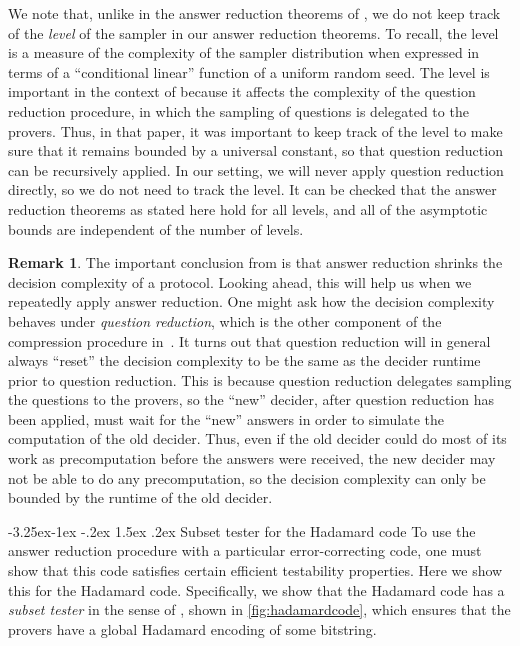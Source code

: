 \documentclass[11pt]{article}
\makeatletter
\renewcommand{\subsection}{\@startsection{subsection}{2}{\z@}%
             {-3.25ex\@plus -1ex \@minus -.2ex}%
             {1.5ex \@plus .2ex}%
             {\normalfont\large\scshape\bfseries}}
\theoremstyle{plain}
\theoremstyle{definition}
\newtheorem{remark}[theorem]{Remark}
\newcommand{\1}{\mathbb{1}} %
\makeatother
\begin{document}
We note that, unlike in the answer reduction theorems of \cite{JNVWY'20}, we do not keep track of the \emph{level} of the sampler in our answer reduction theorems. To recall, the level is a measure of the complexity of the sampler distribution when expressed in terms of a ``conditional linear'' function of a uniform random seed. The level is important in the context of \cite{JNVWY'20} because it affects the complexity of the question reduction procedure, in which the sampling of questions is delegated to the provers. Thus, in that paper, it was important to keep track of the level to make sure that it remains bounded by a universal constant, so that question reduction can be recursively applied. In our setting, we will never apply question reduction directly, so we do not need to track the level. It can be checked that the answer reduction theorems as stated here hold for all levels, and all of the asymptotic bounds are independent of the number of levels.

\begin{remark}\label{rem:qr-decision-complexity}
The important conclusion from  is that answer reduction shrinks the decision complexity of a protocol. Looking ahead, this will help us when we repeatedly apply answer reduction. One might ask how the decision complexity behaves under \emph{question reduction}, which is the other component of the compression procedure in~\cite{JNVWY'20}. It turns out that question reduction will in general always ``reset'' the decision complexity to be the same as the decider runtime prior to question reduction. This is because question reduction delegates sampling the questions to the provers, so the ``new'' decider, after question reduction has been applied, must wait for the ``new'' answers in order to simulate the computation of the old decider. Thus, even if the old decider could do most of its work as precomputation before the answers were received, the new decider may not be able to do any precomputation, so the decision complexity can only be bounded by the runtime of the old decider.
\end{remark}


\subsection{Subset tester for the Hadamard code}
\label{sec:subset_tester}
To use the \cite{neexp} answer reduction procedure with a particular error-correcting code, one must show that this code satisfies certain efficient testability properties. Here we show this for the Hadamard code. Specifically, we show that the Hadamard code has a \emph{subset tester} in the sense of \cite[Section 16]{neexp}, shown in \cref{fig:hadamardcode}, which ensures that the provers have a global Hadamard encoding of some bitstring.
\end{document}
